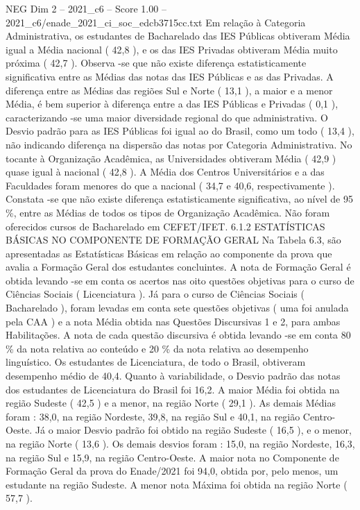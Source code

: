 \begin{textsample}{NEG Dim 2 – 2021\_c6 – Score 1.00 – 2021\_c6/enade\_2021\_ci\_soc\_edcb3715cc.txt}
Em relação à Categoria Administrativa, os estudantes de Bacharelado das IES Públicas obtiveram Média igual a Média nacional ( 42,8 ), e os das IES Privadas obtiveram Média muito próxima ( 42,7 ).
Observa -se que não existe diferença estatisticamente significativa entre as Médias das notas das IES Públicas e as das Privadas.
A diferença entre as Médias das regiões Sul e Norte ( 13,1 ), a maior e a menor Média, é bem superior à diferença entre a das IES Públicas e Privadas ( 0,1 ), caracterizando -se uma maior diversidade regional do que administrativa.
O Desvio padrão para as IES Públicas foi igual ao do Brasil, como um todo ( 13,4 ), não indicando diferença na dispersão das notas por Categoria Administrativa.
No tocante à Organização Acadêmica, as Universidades obtiveram Média ( 42,9 ) quase igual à nacional ( 42,8 ).
A Média dos Centros Universitários e a das Faculdades foram menores do que a nacional ( 34,7 e 40,6, respectivamente ).
Constata -se que não existe diferença estatisticamente significativa, ao nível de 95 \%, entre as Médias de todos os tipos de Organização Acadêmica.
Não foram oferecidos cursos de Bacharelado em CEFET/IFET. 6.1.2 ESTATÍSTICAS BÁSICAS NO COMPONENTE DE FORMAÇÃO GERAL Na Tabela 6.3, são apresentadas as Estatísticas Básicas em relação ao componente da prova que avalia a Formação Geral dos estudantes concluintes.
A nota de Formação Geral é obtida levando -se em conta os acertos nas oito questões objetivas para o curso de Ciências Sociais ( Licenciatura ).
Já para o curso de Ciências Sociais ( Bacharelado ), foram levadas em conta sete questões objetivas ( uma foi anulada pela CAA ) e a nota Média obtida nas Questões Discursivas 1 e 2, para ambas Habilitações.
A nota de cada questão discursiva é obtida levando -se em conta 80 \% da nota relativa ao conteúdo e 20 \% da nota relativa ao desempenho linguístico.
Os estudantes de Licenciatura, de todo o Brasil, obtiveram desempenho médio de 40,4.
Quanto à variabilidade, o Desvio padrão das notas dos estudantes de Licenciatura do Brasil foi 16,2.
A maior Média foi obtida na região Sudeste ( 42,5 ) e a menor, na região Norte ( 29,1 ).
As demais Médias foram : 38,0, na região Nordeste, 39,8, na região Sul e 40,1, na região Centro-Oeste.
Já o maior Desvio padrão foi obtido na região Sudeste ( 16,5 ), e o menor, na região Norte ( 13,6 ).
Os demais desvios foram : 15,0, na região Nordeste, 16,3, na região Sul e 15,9, na região Centro-Oeste.
A maior nota no Componente de Formação Geral da prova do Enade/2021 foi 94,0, obtida por, pelo menos, um estudante na região Sudeste.
A menor nota Máxima foi obtida na região Norte ( 57,7 ).

\end{textsample}
